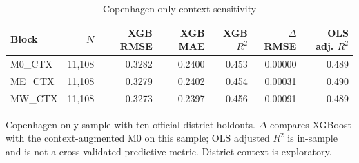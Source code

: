 \begin{table}[p]
\centering
\small
\begin{threeparttable}
\caption{Copenhagen-only context sensitivity}\label{tab:app-copenhagen-context}
\begin{tabular}{>{\raggedright\arraybackslash}p{3cm}rrrrrr}
\toprule
Block & $N$ & XGB RMSE & XGB MAE & XGB $R^2$ & $\Delta$ RMSE & OLS adj. $R^2$ \\
\midrule
M0\_\allowbreak{}CTX & 11,108 & 0.3282 & 0.2400 & 0.453 & 0.00000 & 0.489 \\
ME\_\allowbreak{}CTX & 11,108 & 0.3279 & 0.2402 & 0.454 & 0.00031 & 0.490 \\
MW\_\allowbreak{}CTX & 11,108 & 0.3273 & 0.2397 & 0.456 & 0.00091 & 0.489 \\
\bottomrule
\end{tabular}
\begin{tablenotes}[flushleft]\footnotesize
\item Copenhagen-only sample with ten official district holdouts. $\Delta$ compares XGBoost with the context-augmented M0 on this sample; OLS adjusted $R^2$ is in-sample and is not a cross-validated predictive metric. District context is exploratory.
\end{tablenotes}
\end{threeparttable}
\end{table}
